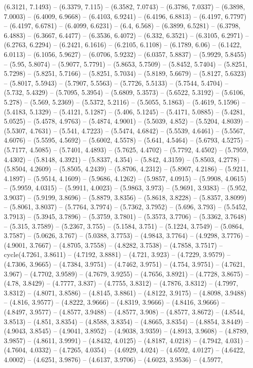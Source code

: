 (6.3121, 7.1493) -- (6.3379, 7.115) -- (6.3582, 7.0743) -- (6.3786, 7.0337) -- (6.3898, 7.0003) -- (6.4009, 6.9668) -- (6.4103, 6.9241) -- (6.4196, 6.8813) -- (6.4197, 6.7797) -- (6.4197, 6.6781) -- (6.4099, 6.6231) -- (6.4, 6.568) -- (6.3899, 6.5281) -- (6.3798, 6.4883) -- (6.3667, 6.4477) -- (6.3536, 6.4072) -- (6.332, 6.3521) -- (6.3105, 6.2971) -- (6.2763, 6.2294) -- (6.2421, 6.1616) -- (6.2105, 6.1108) -- (6.1789, 6.06) -- (6.1422, 6.0113) -- (6.1056, 5.9627) -- (6.0706, 5.9232) -- (6.0357, 5.8837) -- (5.9929, 5.8455) -- (5.95, 5.8074) -- (5.9077, 5.7791) -- (5.8653, 5.7509) -- (5.8452, 5.7404) -- (5.8251, 5.7298) -- (5.8251, 5.7166) -- (5.8251, 5.7034) -- (5.8189, 5.6679) -- (5.8127, 5.6323) -- (5.8017, 5.5943) -- (5.7907, 5.5563) -- (5.7726, 5.5133) -- (5.7544, 5.4704) -- (5.732, 5.4329) -- (5.7095, 5.3954) -- (5.6809, 5.3573) -- (5.6522, 5.3192) -- (5.6106, 5.278) -- (5.569, 5.2369) -- (5.5372, 5.2116) -- (5.5055, 5.1863) -- (5.4619, 5.1596) -- (5.4183, 5.1329) -- (5.4121, 5.1287) -- (5.406, 5.1245) -- (5.4171, 5.0885) -- (5.4281, 5.0525) -- (5.4578, 4.9763) -- (5.4874, 4.9001) -- (5.5039, 4.852) -- (5.5204, 4.8039) -- (5.5307, 4.7631) -- (5.541, 4.7223) -- (5.5474, 4.6842) -- (5.5539, 4.6461) -- (5.5567, 4.6076) -- (5.5595, 4.5692) -- (5.6002, 4.5578) -- (5.641, 4.5464) -- (5.6793, 4.5275) -- (5.7177, 4.5085) -- (5.7401, 4.4893) -- (5.7625, 4.4702) -- (5.7792, 4.4502) -- (5.7959, 4.4302) -- (5.8148, 4.3921) -- (5.8337, 4.354) -- (5.842, 4.3159) -- (5.8503, 4.2778) -- (5.8504, 4.2609) -- (5.8505, 4.2439) -- (5.8706, 4.2312) -- (5.8907, 4.2186) -- (5.9211, 4.1897) -- (5.9514, 4.1609) -- (5.9686, 4.1262) -- (5.9857, 4.0915) -- (5.9908, 4.0615) -- (5.9959, 4.0315) -- (5.9911, 4.0023) -- (5.9863, 3.973) -- (5.9691, 3.9383) -- (5.952, 3.9037) -- (5.9199, 3.8696) -- (5.8879, 3.8356) -- (5.8618, 3.8228) -- (5.8357, 3.8099) -- (5.8061, 3.8037) -- (5.7764, 3.7974) -- (5.7362, 3.7952) -- (5.696, 3.793) -- (5.5452, 3.7913) -- (5.3945, 3.7896) -- (5.3759, 3.7801) -- (5.3573, 3.7706) -- (5.3362, 3.7648) -- (5.315, 3.7589) -- (5.2367, 3.755) -- (5.1584, 3.751) -- (5.1224, 3.7549) -- (5.0864, 3.7587) -- (5.0626, 3.767) -- (5.0388, 3.7753) -- (4.9843, 3.7764) -- (4.9298, 3.7776) -- (4.9001, 3.7667) -- (4.8705, 3.7558) -- (4.8282, 3.7538) -- (4.7858, 3.7517) -- cycle(4.7261, 3.8611) -- (4.7192, 3.8881) -- (4.721, 3.923) -- (4.7229, 3.9579) -- (4.7306, 3.9665) -- (4.7384, 3.9751) -- (4.7462, 3.9751) -- (4.754, 3.9751) -- (4.7621, 3.967) -- (4.7702, 3.9589) -- (4.7679, 3.9255) -- (4.7656, 3.8921) -- (4.7728, 3.8675) -- (4.78, 3.8429) -- (4.7777, 3.837) -- (4.7755, 3.8312) -- (4.7876, 3.8312) -- (4.7997, 3.8312) -- (4.8071, 3.8586) -- (4.8145, 3.8861) -- (4.8122, 3.9175) -- (4.8098, 3.9488) -- (4.816, 3.9577) -- (4.8222, 3.9666) -- (4.8319, 3.9666) -- (4.8416, 3.9666) -- (4.8497, 3.9577) -- (4.8577, 3.9488) -- (4.8577, 3.908) -- (4.8577, 3.8672) -- (4.8544, 3.8513) -- (4.851, 3.8354) -- (4.8588, 3.8354) -- (4.8665, 3.8354) -- (4.8854, 3.8449) -- (4.9043, 3.8545) -- (4.9041, 3.8952) -- (4.9038, 3.9359) -- (4.8913, 3.9608) -- (4.8789, 3.9857) -- (4.8611, 3.9991) -- (4.8432, 4.0125) -- (4.8187, 4.0218) -- (4.7942, 4.031) -- (4.7604, 4.0332) -- (4.7265, 4.0354) -- (4.6929, 4.024) -- (4.6592, 4.0127) -- (4.6422, 4.0002) -- (4.6251, 3.9876) -- (4.6137, 3.9706) -- (4.6023, 3.9536) -- (4.5977, 